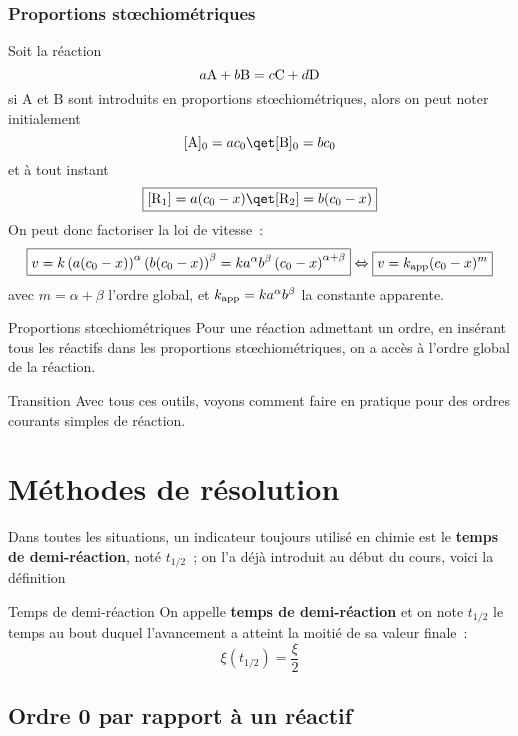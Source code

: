 \documentclass[../main/main.tex]{subfiles}
\begin{document}
\subsubsection{Proportions stœchiométriques}
Soit la réaction
\[a{\rm A} + b{\rm B}
        =
  c{\rm C} +d{\rm D}
\]
si A et B sont introduits en proportions stœchiométriques, alors on peut
noter initialement
\[[{\rm A}]_0 = ac_0
    \qet
  [{\rm B}]_0 = bc_0
\]
et à tout instant
\[\boxed{
  [{\rm R}_1] = a (c_0 - x)
    \qet
  [{\rm R}_2] = b (c_0 - x)
    }
\]
On peut donc factoriser la loi de vitesse~:
\begin{gather*}
    \boxed{
    v = k \left( a (c_0 - x)\right)^{\alpha}\left( b (c_0 - x)\right)^{\beta}
    = ka^{\alpha}b^{\beta} \left(c_0 - x\right)^{\alpha + \beta}
    }
    \Leftrightarrow
    \boxed{v = k_{\rm app} (c_0 -x)^{m}}
\end{gather*}
avec $m = \alpha + \beta$ l'ordre global, et $k_{\rm app} =
ka^{\alpha}b^{\beta}$ la constante apparente.

\begin{prop}[label=prop:stoe, heart, halign=center]{Proportions stœchiométriques}
    \textcolor{\switch{black!100}{red!10}}{
    Pour une réaction admettant un ordre, en insérant tous les réactifs dans les
    proportions stœchiométriques, on a accès à l'ordre global de la réaction.}
\end{prop}

\begin{instruc}[trans]{Transition}
    Avec tous ces outils, voyons comment faire en pratique pour des ordres
    courants simples de réaction.
\end{instruc}

\section{Méthodes de résolution}

Dans toutes les situations, un indicateur toujours utilisé en chimie est le
\textbf{temps de demi-réaction}, noté $t_{1/2}$~; on l'a déjà introduit au début
du cours, voici la définition

\begin{defi}[label=def:tundemi]{Temps de demi-réaction}
    On appelle \textbf{temps de demi-réaction} et on note $t_{1/2}$ le temps au
    bout duquel l'avancement a atteint la moitié de sa valeur finale~:
    \[\boxed{\xi(t_{1/2}) = \frac{\xi}{2}}\]
\end{defi}

\subsection{Ordre 0 par rapport à un réactif}
\end{document}

